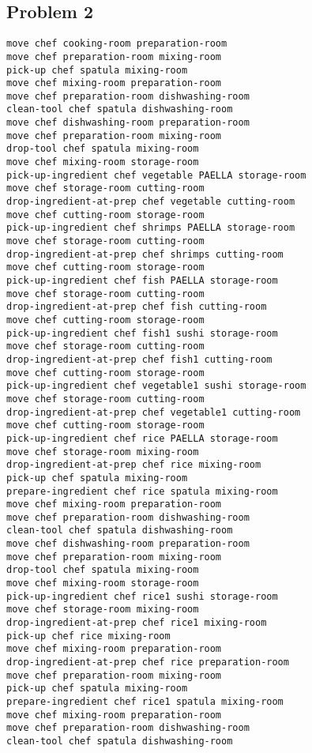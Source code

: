 \documentclass[a4paper,12pt]{article}
\begin{document}
\subsection{Problem 2}
\label{sec:plan2}
\begin{lstlisting}[language=PDDL, caption=Plan for Problem 2]
move chef cooking-room preparation-room 
move chef preparation-room mixing-room 
pick-up chef spatula mixing-room 
move chef mixing-room preparation-room 
move chef preparation-room dishwashing-room 
clean-tool chef spatula dishwashing-room 
move chef dishwashing-room preparation-room 
move chef preparation-room mixing-room 
drop-tool chef spatula mixing-room 
move chef mixing-room storage-room 
pick-up-ingredient chef vegetable PAELLA storage-room 
move chef storage-room cutting-room 
drop-ingredient-at-prep chef vegetable cutting-room 
move chef cutting-room storage-room 
pick-up-ingredient chef shrimps PAELLA storage-room 
move chef storage-room cutting-room 
drop-ingredient-at-prep chef shrimps cutting-room 
move chef cutting-room storage-room 
pick-up-ingredient chef fish PAELLA storage-room 
move chef storage-room cutting-room 
drop-ingredient-at-prep chef fish cutting-room 
move chef cutting-room storage-room 
pick-up-ingredient chef fish1 sushi storage-room 
move chef storage-room cutting-room 
drop-ingredient-at-prep chef fish1 cutting-room 
move chef cutting-room storage-room 
pick-up-ingredient chef vegetable1 sushi storage-room 
move chef storage-room cutting-room 
drop-ingredient-at-prep chef vegetable1 cutting-room 
move chef cutting-room storage-room 
pick-up-ingredient chef rice PAELLA storage-room 
move chef storage-room mixing-room 
drop-ingredient-at-prep chef rice mixing-room 
pick-up chef spatula mixing-room 
prepare-ingredient chef rice spatula mixing-room 
move chef mixing-room preparation-room 
move chef preparation-room dishwashing-room 
clean-tool chef spatula dishwashing-room 
move chef dishwashing-room preparation-room 
move chef preparation-room mixing-room 
drop-tool chef spatula mixing-room 
move chef mixing-room storage-room 
pick-up-ingredient chef rice1 sushi storage-room 
move chef storage-room mixing-room 
drop-ingredient-at-prep chef rice1 mixing-room 
pick-up chef rice mixing-room 
move chef mixing-room preparation-room 
drop-ingredient-at-prep chef rice preparation-room 
move chef preparation-room mixing-room 
pick-up chef spatula mixing-room 
prepare-ingredient chef rice1 spatula mixing-room 
move chef mixing-room preparation-room 
move chef preparation-room dishwashing-room 
clean-tool chef spatula dishwashing-room 

\end{lstlisting}
\end{document}
